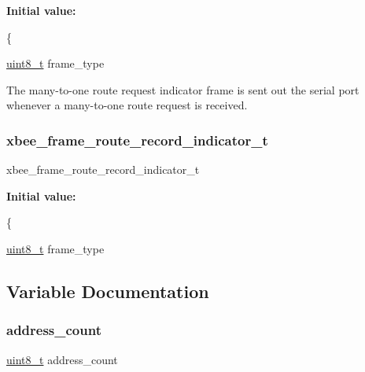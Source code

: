 {\bfseries Initial value\+:}
\begin{DoxyCode}
\{
   
   \hyperlink{group__hal__dos_gae1affc9ca37cfb624959c866a73f83c2}{uint8\_t}          frame\_type
\end{DoxyCode}


The many-\/to-\/one route request indicator frame is sent out the serial port whenever a many-\/to-\/one route request is received. 

\mbox{\label{group__xbee__route_gac3b91f492a4301331d6c0c39c2516b0e}} 
\subsubsection{\texorpdfstring{xbee\+\_\+frame\+\_\+route\+\_\+record\+\_\+indicator\+\_\+t}{xbee\_frame\_route\_record\_indicator\_t}}
{\footnotesize\ttfamily xbee\+\_\+frame\+\_\+route\+\_\+record\+\_\+indicator\+\_\+t}

{\bfseries Initial value\+:}
\begin{DoxyCode}
\{
   
   \hyperlink{group__hal__dos_gae1affc9ca37cfb624959c866a73f83c2}{uint8\_t}          frame\_type
\end{DoxyCode}


\subsection{Variable Documentation}
\mbox{\label{group__xbee__route_ga568b7e68dfcb5aabdbcf38de26f1b63d}} 
\subsubsection{\texorpdfstring{address\+\_\+count}{address\_count}}
{\footnotesize\ttfamily \hyperlink{group__hal__dos_gae1affc9ca37cfb624959c866a73f83c2}{uint8\+\_\+t} address\+\_\+count}



